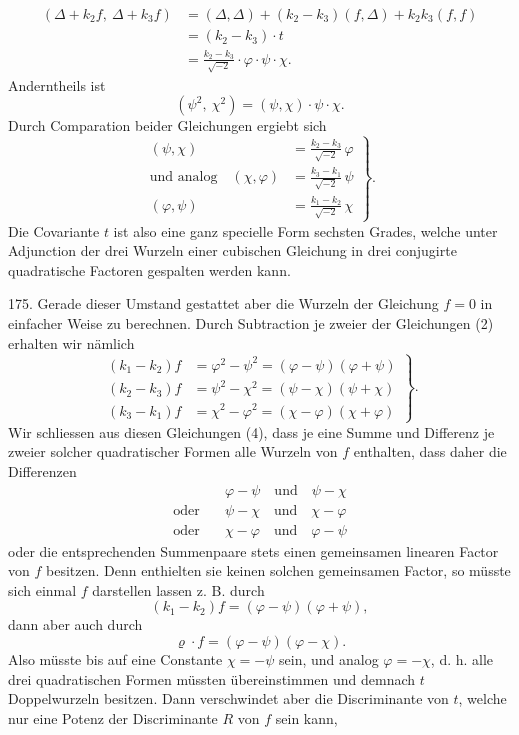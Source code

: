 \documentclass[11pt]{article}
\providecommand{\weberpage}[1]{}
\providecommand{\weq}[2]{\begin{equation}\tag{#1}#2\end{equation}}
\let\Delta\varDelta
\begin{document}
\weberpage{194}
\[
\begin{aligned}
(\Delta+k_2f,\ \Delta+k_3f) &= (\Delta,\Delta)+(k_2-k_3)(f,\Delta)+k_2k_3(f,f) \\
&= (k_2-k_3)\cdot t \\
&= \frac{k_2-k_3}{\sqrt{-2}} \cdot \varphi \cdot \psi \cdot \chi.
\end{aligned}
\]
Anderntheils ist
\[
(\psi^2,\ \chi^2) = (\psi,\chi)\cdot\psi\cdot\chi.
\]
Durch Comparation beider Gleichungen ergiebt sich
\weq{3}{\left.\begin{aligned}
(\psi,\chi) &= \frac{k_2-k_3}{\sqrt{-2}}\,\varphi \\
\text{und analog}\quad (\chi,\varphi) &= \frac{k_3-k_1}{\sqrt{-2}}\,\psi \\
(\varphi,\psi) &= \frac{k_1-k_2}{\sqrt{-2}}\,\chi
\end{aligned}\right\}.}
Die Covariante $t$ ist also eine ganz specielle Form sechsten Grades, welche unter Adjunction der drei Wurzeln einer cubischen Gleichung in drei conjugirte quadratische Factoren gespalten werden kann.

175. Gerade dieser Umstand gestattet aber die Wurzeln der Gleichung $f=0$ in einfacher Weise zu berechnen. Durch Subtraction je zweier der Gleichungen (2) erhalten wir nämlich
\weq{4}{\left.\begin{aligned}
(k_1-k_2)f &= \varphi^2-\psi^2 = (\varphi-\psi)(\varphi+\psi) \\
(k_2-k_3)f &= \psi^2-\chi^2 = (\psi-\chi)(\psi+\chi) \\
(k_3-k_1)f &= \chi^2-\varphi^2 = (\chi-\varphi)(\chi+\varphi)
\end{aligned}\right\}.}
Wir schliessen aus diesen Gleichungen (4), dass je eine Summe und Differenz je zweier solcher quadratischer Formen alle Wurzeln von $f$ enthalten, dass daher die Differenzen
\[
\begin{aligned}
&\varphi-\psi \quad \text{und} \quad \psi-\chi \\
\text{oder}\quad &\psi-\chi \quad \text{und} \quad \chi-\varphi \\
\text{oder}\quad &\chi-\varphi \quad \text{und} \quad \varphi-\psi
\end{aligned}
\]
oder die entsprechenden Summenpaare stets einen gemeinsamen linearen Factor von $f$ besitzen. Denn enthielten sie keinen solchen gemeinsamen Factor, so müsste sich einmal $f$ darstellen lassen z. B. durch
\[
(k_1-k_2)f = (\varphi-\psi)(\varphi+\psi),
\]
dann aber auch durch
\[
\varrho \cdot f = (\varphi-\psi)(\varphi-\chi).
\]
Also müsste bis auf eine Constante $\chi = -\psi$ sein, und analog $\varphi = -\chi$, d. h. alle drei quadratischen Formen müssten übereinstimmen und demnach $t$ Doppelwurzeln besitzen. Dann verschwindet aber die Discriminante von $t$, welche nur eine Potenz der Discriminante $R$ von $f$ sein kann,
\end{document}
